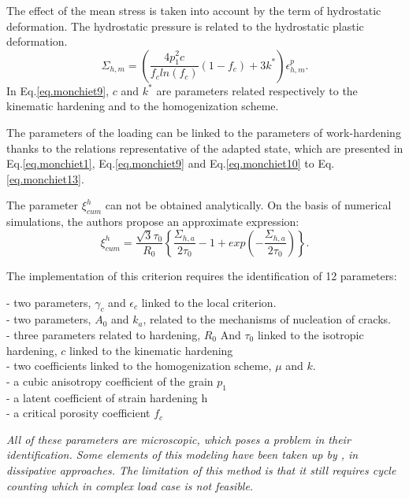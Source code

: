 The effect of the mean stress is taken into account by the term of hydrostatic deformation. The hydrostatic pressure is related to the hydrostatic plastic deformation. 
\begin{equation}
\Sigma_{h,m}=\left( \dfrac{4p_1^2c}{f_cln(f_c)}\left( 1-f_c\right)+3k^{\ast} \right) \epsilon_{h,m}^p.
\label{eq.monchiet9}
\end{equation}
In Eq.\eqref{eq.monchiet9}, $c$ and $k^{\ast}$ are parameters related respectively to the kinematic hardening and to the homogenization scheme.

The parameters of the loading can be linked to the parameters of work-hardening thanks to the relations representative of the adapted state, which are presented in Eq.\eqref{eq.monchiet1}, Eq.\eqref{eq.monchiet9} and Eq.\eqref{eq.monchiet10} to Eq.\eqref{eq.monchiet13}.

The parameter $\xi_{cum}^h$ can not be obtained analytically. On the basis of numerical simulations, the authors propose an approximate expression:
\begin{equation}
\xi_{cum}^h=\dfrac{\sqrt{3}\tau_0}{R_0}\left\lbrace \dfrac{\Sigma_{h,a}}{2\tau_0}-1+exp\left(-\dfrac{\Sigma_{h,a}}{2\tau_0} \right) \right\rbrace .
\label{eq.monchiet17}
\end{equation}





The implementation of this criterion requires the identification of 12 parameters:
\begin{flushleft}
	\qquad - \qquad two parameters, $\gamma_c$ and $\epsilon_c$ linked to the local criterion.\\
	\qquad - \qquad two parameters, $A_0$ and $k_a$, related to the mechanisms of nucleation of cracks.\\
	\qquad - \qquad three parameters related to hardening, $R_0$ And $\tau_0$ linked to the isotropic hardening, $c$ linked to  the kinematic hardening\\
	\qquad - \qquad two coefficients linked to the homogenization scheme, $\mu$ and $k$.\\
	\qquad - \qquad a cubic anisotropy coefficient of the grain $p_1$\\
	\qquad - \qquad a latent coefficient of strain hardening h\\
	\qquad - \qquad a critical porosity coefficient $f_c$\\
\end{flushleft}

\textit{All of these parameters are microscopic, which poses a problem in their identification. Some elements of this modeling have been taken up by \cite{charkaluk2009revisiting}, \cite{charkaluk2007approche} in dissipative approaches. The limitation of this method is that it still requires cycle counting which in complex load case is not feasible.}

